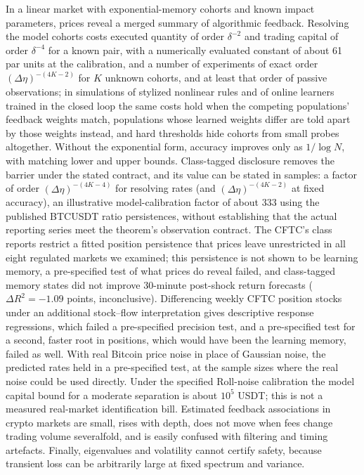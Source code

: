 \documentclass[12pt]{article}
\theoremstyle{definition}
\theoremstyle{remark}
\begin{document}
In a linear market with exponential-memory cohorts and known impact parameters, prices reveal a merged summary of algorithmic feedback. Resolving the model cohorts costs executed quantity of order $\delta^{-2}$ and trading capital of order $\delta^{-4}$ for a known pair, with a numerically evaluated constant of about 61 par units at the calibration, and a number of experiments of exact order $(\Delta\eta)^{-(4K-2)}$ for $K$ unknown cohorts, and at least that order of passive observations; in simulations of stylized nonlinear rules and of online learners trained in the closed loop the same costs hold when the competing populations' feedback weights match, populations whose learned weights differ are told apart by those weights instead, and hard thresholds hide cohorts from small probes altogether. Without the exponential form, accuracy improves only as $1/\log N$, with matching lower and upper bounds. Class-tagged disclosure removes the barrier under the stated contract, and its value can be stated in samples: a factor of order $(\Delta\eta)^{-(4K-4)}$ for resolving rates (and $(\Delta\eta)^{-(4K-2)}$ at fixed accuracy), an illustrative model-calibration factor of about 333 using the published BTCUSDT ratio persistences, without establishing that the actual reporting series meet the theorem's observation contract. The CFTC's class reports restrict a fitted position persistence that prices leave unrestricted in all eight regulated markets we examined; this persistence is not shown to be learning memory, a pre-specified test of what prices do reveal failed, and class-tagged memory states did not improve 30-minute post-shock return forecasts ($\Delta R^2=-1.09$ points, inconclusive). Differencing weekly CFTC position stocks under an additional stock--flow interpretation gives descriptive response regressions, which failed a pre-specified precision test, and a pre-specified test for a second, faster root in positions, which would have been the learning memory, failed as well. With real Bitcoin price noise in place of Gaussian noise, the predicted rates held in a pre-specified test, at the sample sizes where the real noise could be used directly. Under the specified Roll-noise calibration the model capital bound for a moderate separation is about $10^5$ USDT; this is not a measured real-market identification bill. Estimated feedback associations in crypto markets are small, rises with depth, does not move when fees change trading volume severalfold, and is easily confused with filtering and timing artefacts. Finally, eigenvalues and volatility cannot certify safety, because transient loss can be arbitrarily large at fixed spectrum and variance.
\end{document}
